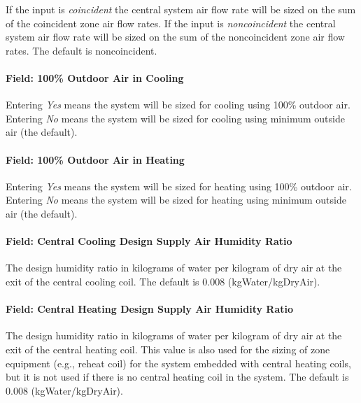 If the input is \emph{coincident} the central system air flow rate will be sized on the sum of the coincident zone air flow rates. If the input is \emph{noncoincident} the central system air flow rate will be sized on the sum of the noncoincident zone air flow rates. The default is noncoincident.

\paragraph{Field: 100\% Outdoor Air in Cooling}\label{field-100-outdoor-air-in-cooling}

Entering \emph{Yes} means the system will be sized for cooling using 100\% outdoor air. Entering \emph{No} means the system will be sized for cooling using minimum outside air (the default).

\paragraph{Field: 100\% Outdoor Air in Heating}\label{field-100-outdoor-air-in-heating}

Entering \emph{Yes} means the system will be sized for heating using 100\% outdoor air. Entering \emph{No} means the system will be sized for heating using minimum outside air (the default).

\paragraph{Field: Central Cooling Design Supply Air Humidity Ratio}\label{field-central-cooling-design-supply-air-humidity-ratio}

The design humidity ratio in kilograms of water per kilogram of dry air at the exit of the central cooling coil. The default is 0.008 (kgWater/kgDryAir).

\paragraph{Field: Central Heating Design Supply Air Humidity Ratio}\label{field-central-heating-design-supply-air-humidity-ratio}

The design humidity ratio in kilograms of water per kilogram of dry air at the exit of the central heating coil. This value is also used for the sizing of zone equipment (e.g., reheat coil) for the system embedded with central heating coils, but it is not used if there is no central heating coil in the system. The default is 0.008 (kgWater/kgDryAir).

